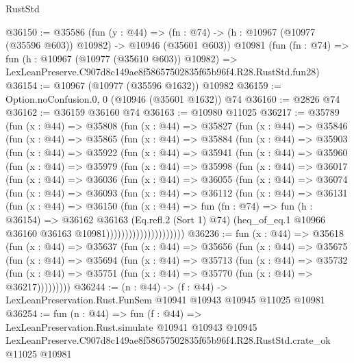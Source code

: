 \begin{lexlean}{RustStd}
\begin{coremodule}
@36150 := @35586
    (fun (y : @44) =>
    (fn : @74) -> (h : @10967 (@10977 (@35596 @603)) @10982) -> @10946 (@35601 @603))
    @10981
    (fun (fn : @74) =>
    fun (h : @10967 (@10977 (@35610 @603)) @10982) =>
    LexLeanPreserve.C907d8c149ae8f58657502835f65b96f4.R28.RustStd.fun28)
@36154 := @10967 (@10977 (@35596 @1632)) @10982
@36159 := Option.noConfusion.{0, 0} (@10946 (@35601 @1632)) @74
@36160 := @2826 @74
@36162 := @36159 @36160 @74
@36163 := @10980 @11025
@36217 := @35789
    (fun (x : @44) =>
    @35808
      (fun (x : @44) =>
      @35827
        (fun (x : @44) =>
        @35846
          (fun (x : @44) =>
          @35865
            (fun (x : @44) =>
            @35884
              (fun (x : @44) =>
              @35903
                (fun (x : @44) =>
                @35922
                  (fun (x : @44) =>
                  @35941
                    (fun (x : @44) =>
                    @35960
                      (fun (x : @44) =>
                      @35979
                        (fun (x : @44) =>
                        @35998
                          (fun (x : @44) =>
                          @36017
                            (fun (x : @44) =>
                            @36036
                              (fun (x : @44) =>
                              @36055
                                (fun (x : @44) =>
                                @36074
                                  (fun (x : @44) =>
                                  @36093
                                    (fun (x : @44) =>
                                    @36112
                                      (fun (x : @44) =>
                                      @36131
                                        (fun (x : @44) =>
                                        @36150
                                          (fun (x : @44) =>
                                          fun (fn : @74) =>
                                          fun (h : @36154) =>
                                          @36162
                                            @36163
                                            (Eq.refl.{2} (Sort 1) @74)
                                            (heq_of_eq.{1}
                                              @10966
                                              @36160
                                              @36163
                                              @10981)))))))))))))))))))))
@36236 := fun (x : @44) =>
  @35618
    (fun (x : @44) =>
    @35637
      (fun (x : @44) =>
      @35656
        (fun (x : @44) =>
        @35675
          (fun (x : @44) =>
          @35694
            (fun (x : @44) =>
            @35713
              (fun (x : @44) =>
              @35732
                (fun (x : @44) => @35751 (fun (x : @44) => @35770 (fun (x : @44) => @36217)))))))))
@36244 := (n : @44) ->
  (f : @44) -> LexLeanPreservation.Rust.FunSem @10941 @10943 @10945 @11025 @10981
@36254 := fun (n : @44) =>
  fun (f : @44) =>
  LexLeanPreservation.Rust.simulate
    @10941
    @10943
    @10945
    LexLeanPreserve.C907d8c149ae8f58657502835f65b96f4.R28.RustStd.crate_ok
    @11025
    @10981
\end{coremodule}
\end{lexlean}
